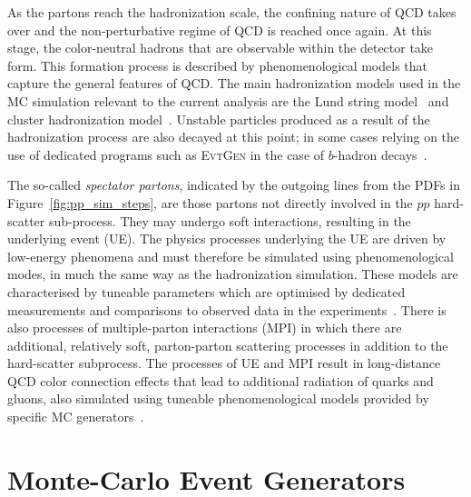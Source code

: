 As the partons reach the hadronization scale, the confining nature of QCD takes over and the non-perturbative regime of QCD is reached
once again.
At this stage, the color-neutral hadrons that are observable within the detector take form.
This formation process is described by phenomenological models that capture the general
features of QCD.
The main hadronization models used in the MC simulation relevant to the current analysis are the
Lund string model~\cite{Andersson:1983ia} and cluster hadronization model~\cite{Webber:1983if}.
Unstable particles produced as a result of the hadronization process are also decayed at this point;
in some cases relying on the use of dedicated programs such as \textsc{EvtGen} in the case of $b$-hadron decays~\cite{Lange:2001uf}.

The so-called \textit{spectator partons}, indicated by the outgoing lines from the PDFs in Figure~\ref{fig:pp_sim_steps},
are those partons not directly involved in the $pp$ hard-scatter sub-process.
They may undergo soft interactions, resulting in the underlying event (UE).
The physics processes underlying the UE are driven by low-energy phenomena and must therefore
be simulated using phenomenological modes, in much the same way as the hadronization simulation.
These models are characterised by tuneable parameters which are optimised by dedicated measurements
and comparisons to observed data in the experiments~\cite{UESim}.
There is also processes of multiple-parton interactions (MPI) in which there are additional,
relatively soft, parton-parton scattering processes in addition to the hard-scatter subprocess.
The processes of UE and MPI result in long-distance QCD color connection effects that lead
to additional radiation of quarks and gluons, also simulated using tuneable phenomenological models
provided by specific MC generators~\cite{Sjostrand:2006za,Butterworth:1996zw}.


%
%

\section{Monte-Carlo Event Generators}
\label{sec:mc_gen}

